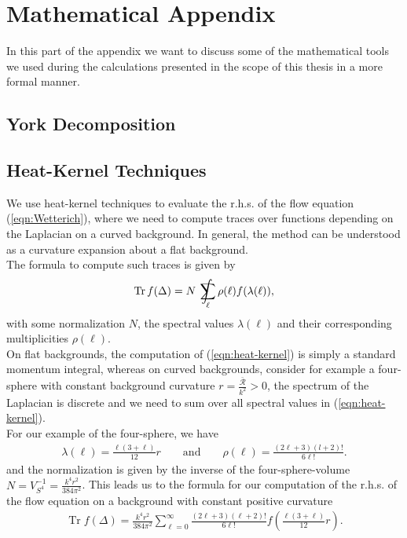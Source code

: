 \chapter{Mathematical Appendix}
In this part of the appendix we want to discuss some of the mathematical tools we used during the calculations presented in the scope of this thesis in a more formal manner.

\section{York Decomposition}


\section{Heat-Kernel Techniques}\label{sec:heat-kernel}
We use heat-kernel techniques to evaluate the r.h.s. of the flow equation (\ref{eqn:Wetterich}), where we need to compute traces over functions depending on the Laplacian on a curved background. In general, the method can be understood as a curvature expansion about a flat background. \\
The formula to compute such traces is given by
\begin{align}
	\operatorname{Tr} f(\Delta)= N \  \int\kern-1.3em\sum_{\ell} \rho(\ell) f(\lambda(\ell)),
	\label{eqn:heat-kernel}
\end{align}
with some normalization $N$, the spectral values $\lambda(\ell)$ and their corresponding multiplicities $\rho(\ell)$. \\
On flat backgrounds, the computation of (\ref{eqn:heat-kernel}) is simply a standard momentum integral, whereas on curved backgrounds, consider for example a four-sphere with constant background curvature $r = \frac{\bar{\mathcal{R}}}{k^2} > 0$, the spectrum of the Laplacian is discrete and we need to sum over all spectral values in (\ref{eqn:heat-kernel}). \\
For our example of the four-sphere, we have
\begin{align}
	\lambda(\ell) = \frac{\ell(3+\ell)}{12}r \qquad \text{and} \qquad \rho(\ell) = \frac{(2\ell + 3)(l+2)!}{6\ell!}.
\end{align}
and the normalization is given by the inverse of the four-sphere-volume $N= V_{S^4}^{-1} = \frac{k^4r^2}{384\pi^2}$. This leads us to the formula for our computation of the r.h.s. of the flow equation on a background with constant positive curvature
\begin{align}
\operatorname{Tr} f(\Delta)=\frac{k^{4} r^{2}}{384 \pi^{2}} \sum_{\ell=0}^{\infty} \frac{(2 \ell+3)(\ell+2) !}{6 \ell !} f\left(\frac{\ell(3+\ell)}{12} r\right)	.
\end{align}
